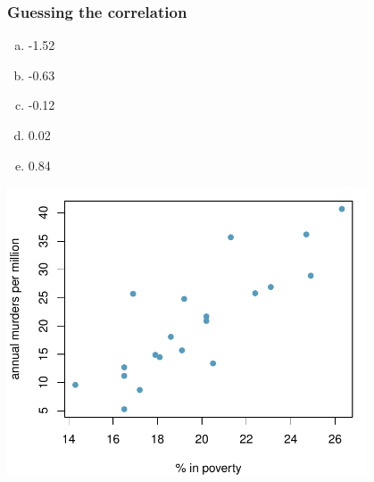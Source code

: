 \documentclass[11pt,containsverbatim,handout,xcolor=xelatex,dvipsnames,table]{beamer}
\newcommand{\solnMult}[1]{#1}
\begin{document}
\begin{frame}
\frametitle{Guessing the correlation}


{
\begin{enumerate}[(a)]
\item -1.52
\item -0.63
\item -0.12
\item 0.02
\item \solnMult{0.84}
\end{enumerate}
}
{
\begin{center}
\includegraphics[width=0.8\textwidth]{figures/murder/annual_murders_per_mil_perc_pov}
\end{center}
}

\end{frame}

\end{document}

